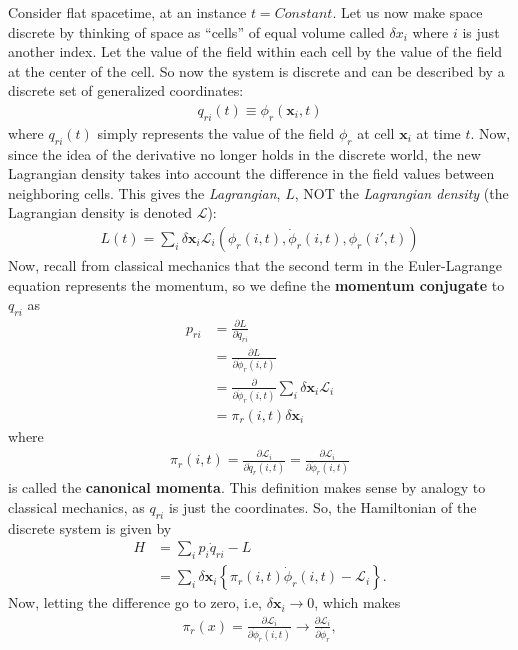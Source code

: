 \documentclass[a4paper,11pt]{article}
\numberwithin{equation}{section}
\theoremstyle{definition}
\newcommand{\p}{\partial}
\newcommand{\lag}{\mathcal{L}}
\begin{document}
Consider flat spacetime, at an instance $t = Constant$. Let us now make space discrete by thinking of space as ``cells'' of equal volume called $\delta x_i$ where $i$ is just another index. Let the value of the field within each cell by the value of the field at the center of the cell. So now the system is discrete and can be described by a discrete set of generalized coordinates:
\begin{align}
q_{ri}(t) \equiv \phi_r(\mathbf{x}_i, t)
\end{align} 
where $q_{ri}(t)$ simply represents the value of the field $\phi_r$ at cell $\mathbf{x}_i$ at time $t$. Now, since the idea of the derivative no longer holds in the discrete world, the new Lagrangian density takes into account the difference in the field values between neighboring cells. This gives the \textit{Lagrangian}, $L$, NOT the \textit{Lagrangian density} (the Lagrangian density is denoted $\lag$):
\begin{align}
L(t) = \sum_{i} \delta \mathbf{x}_i \lag_i (\phi_r(i,t), \dot{\phi}_r(i,t), \phi_r(i',t))
\end{align} 
Now, recall from classical mechanics that the second term in the Euler-Lagrange equation represents the momentum, so we define the \textbf{momentum conjugate} to $q_{ri}$ as
\begin{align}
p_{ri} &= \frac{\p L}{\p \dot{q}_{ri}}\\
&= \frac{\p L}{\p \dot{\phi}_r(i,t)}\\
&= \frac{\p}{\p \dot{\phi}_r(i,t)}\sum_{i} \delta \mathbf{x}_i \lag_i \\
&= \pi_r(i,t)\delta \mathbf{x}_i
\end{align}
where 
\begin{align}
\pi_r(i,t) = \frac{\p\lag_i}{\p \dot{q}_r(i,t)} =\frac{\p\lag_i}{\p \dot{\phi}_r(i,t)}
\end{align}
is called the \textbf{canonical momenta}. This definition makes sense by analogy to classical mechanics, as $q_{ri}$ is just the coordinates. So, the Hamiltonian of the discrete system is given by
\begin{align}
H &= \sum_{i}p_{i}\dot{q}_{ri} - L\\
&= \sum_{i}\delta\mathbf{x}_i \left\{\pi_r(i,t)\dot{\phi}_r(i,t) - \lag_i \right\}.
\end{align}
Now, letting the difference go to zero, i.e, $\delta \mathbf{x}_i \to 0$, which makes
\begin{align}
\pi_r(x) = \frac{\p\lag_i}{\p \dot{\phi}_r(i,t)} \to \frac{\p\lag_i}{\p \dot{\phi}_r},
\end{align}
\end{document}

